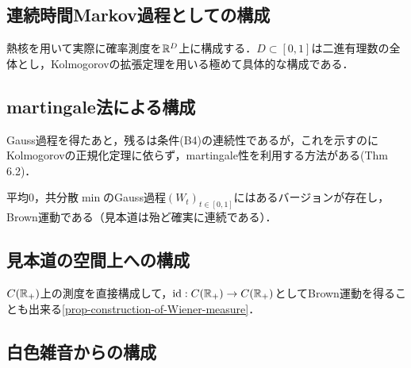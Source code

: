 \documentclass[uplatex,dvipdfmx]{jsreport}
\begin{document}
\subsection{連続時間Markov過程としての構成}

\begin{tcolorbox}[colframe=ForestGreen, colback=ForestGreen!10!white,breakable,colbacktitle=ForestGreen!40!white,coltitle=black,fonttitle=\bfseries\sffamily,
title=]
    熱核を用いて実際に確率測度を$\mathbb{R}^D$上に構成する．$D\subset[0,1]$は二進有理数の全体とし，Kolmogorovの拡張定理を用いる極めて具体的な構成である\cite{舟木}．
\end{tcolorbox}

\subsection{martingale法による構成}

\begin{tcolorbox}[colframe=ForestGreen, colback=ForestGreen!10!white,breakable,colbacktitle=ForestGreen!40!white,coltitle=black,fonttitle=\bfseries\sffamily,
title=]
    Gauss過程を得たあと，残るは条件(B4)の連続性であるが，これを示すのにKolmogorovの正規化定理に依らず，martingale性を利用する方法がある\cite{Bass}(Thm 6.2)．
\end{tcolorbox}


\begin{theorem}[martingaleによる正則化]
    平均$0$，共分散$\min$のGauss過程$(W_t)_{t\in[0,1]}$にはあるバージョンが存在し，Brown運動である（見本道は殆ど確実に連続である）．
\end{theorem}

\subsection{見本道の空間上への構成}

\begin{tcolorbox}[colframe=ForestGreen, colback=ForestGreen!10!white,breakable,colbacktitle=ForestGreen!40!white,coltitle=black,fonttitle=\bfseries\sffamily,
title=]
    $C(\mathbb{R}_+)$上の測度を直接構成して，$\mathrm{id}:C(\mathbb{R}_+)\to C(\mathbb{R}_+)$としてBrown運動を得ることも出来る\ref{prop-construction-of-Wiener-measure}．
\end{tcolorbox}

\subsection{白色雑音からの構成}
\end{document}

